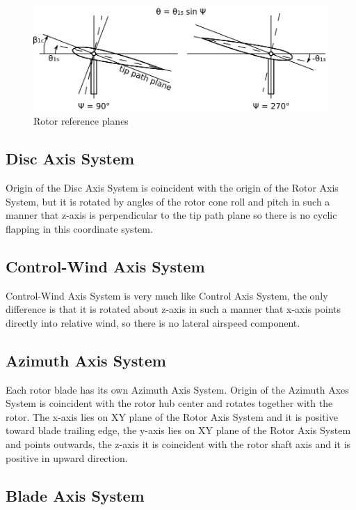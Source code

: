 \begin{figure}[h!]
  \centering
  \includegraphics[width=120mm]{eps/rotor_planes.eps}
  \caption{Rotor reference planes}
\end{figure}

\subsection{Disc Axis System}

Origin of the Disc Axis System is coincident with the origin of the Rotor Axis System, but it is rotated by angles of the rotor cone roll and pitch in such a manner that z-axis is perpendicular to the tip path plane so there is no cyclic flapping in this coordinate system.

\subsection{Control-Wind Axis System}

Control-Wind Axis System is very much like Control Axis System, the only difference is that it is rotated about z-axis in such a manner that x-axis points directly into relative wind, so there is no lateral airspeed component.

\subsection{Azimuth Axis System}

Each rotor blade has its own Azimuth Axis System. Origin of the Azimuth Axes System is coincident with the rotor hub center and rotates together with the rotor. The x-axis lies on XY plane of the Rotor Axis System and it is positive toward blade trailing edge, the y-axis lies on XY plane of the Rotor Axis System and points outwards, the z-axis it is coincident with the rotor shaft axis and it is positive in upward direction.

\subsection{Blade Axis System}

